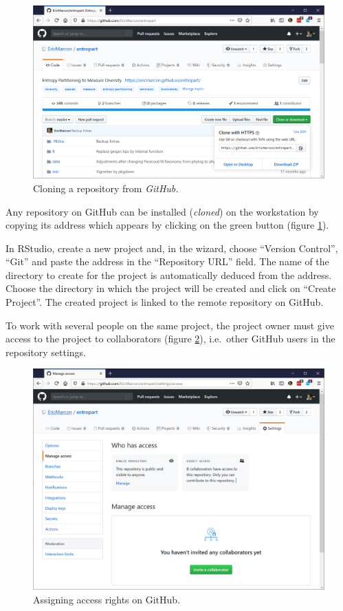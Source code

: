 \documentclass[
  12pt,
  american,
  a4paper,
  extrafontsizes,onecolumn,openright
  ]{memoir}
\begin{document}
\scriptsize

\begin{figure}

{\centering \includegraphics[width=0.8\linewidth]{images/git-Clone} 

}

\caption{Cloning a repository from \emph{GitHub.}}\label{fig:git-Clone}
\end{figure}

\normalsize

Any repository on GitHub can be installed (\emph{cloned}) on the workstation by copying its address which appears by clicking on the green button (figure \ref{fig:git-Clone}).

In RStudio, create a new project and, in the wizard, choose \enquote{Version Control}, \enquote{Git} and paste the address in the \enquote{Repository URL} field.
The name of the directory to create for the project is automatically deduced from the address.
Choose the directory in which the project will be created and click on \enquote{Create Project}.
The created project is linked to the remote repository on GitHub.

To work with several people on the same project, the project owner must give access to the project to collaborators (figure \ref{fig:git-Access}), i.e.~other GitHub users in the repository settings.



\scriptsize

\begin{figure}

{\centering \includegraphics[width=0.8\linewidth]{images/git-Access} 

}

\caption{Assigning access rights on GitHub.}\label{fig:git-Access}
\end{figure}
\end{document}
